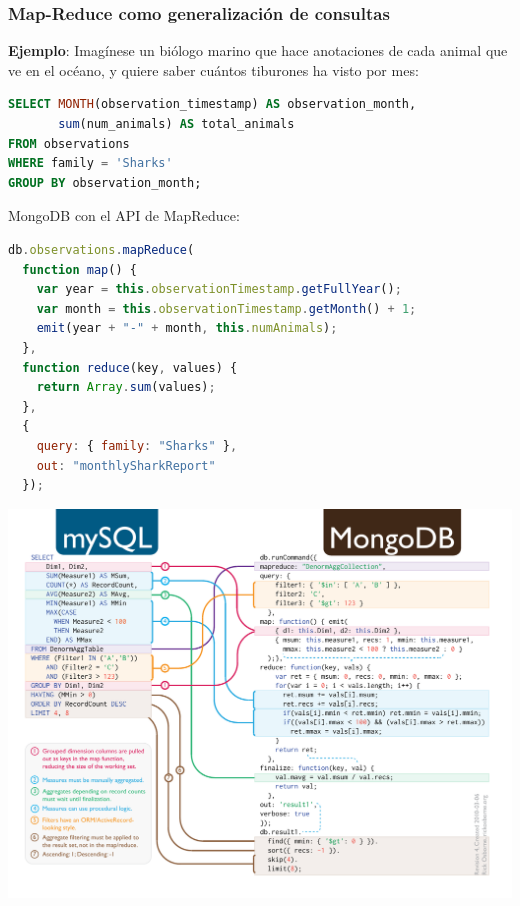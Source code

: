 \documentclass[14pt]{beamer}
\begin{document}
\begin{frame}
  \frametitle{Map-Reduce como generalización de consultas}

  {\bf Ejemplo}: Imagínese un biólogo marino que hace anotaciones de cada
  animal que ve en el océano, y quiere saber cuántos tiburones ha visto por
  mes:

  \begin{lstlisting}[language=SQL]
SELECT MONTH(observation_timestamp) AS observation_month,
       sum(num_animals) AS total_animals
FROM observations
WHERE family = 'Sharks'
GROUP BY observation_month;
\end{lstlisting}

  \framebreak

MongoDB con el API de MapReduce:
\begin{lstlisting}[language=Javascript,basicstyle=\footnotesize\tt]
db.observations.mapReduce(
  function map() {
    var year = this.observationTimestamp.getFullYear();
    var month = this.observationTimestamp.getMonth() + 1;
    emit(year + "-" + month, this.numAnimals);
  },
  function reduce(key, values) {
    return Array.sum(values);
  },
  {
    query: { family: "Sharks" },
    out: "monthlySharkReport"
  });
\end{lstlisting}



\end{frame}

\begin{frame}[plain]
  \includegraphics[width=\textwidth]{img/sql-to-mongodb}
\end{frame}
\end{document}
